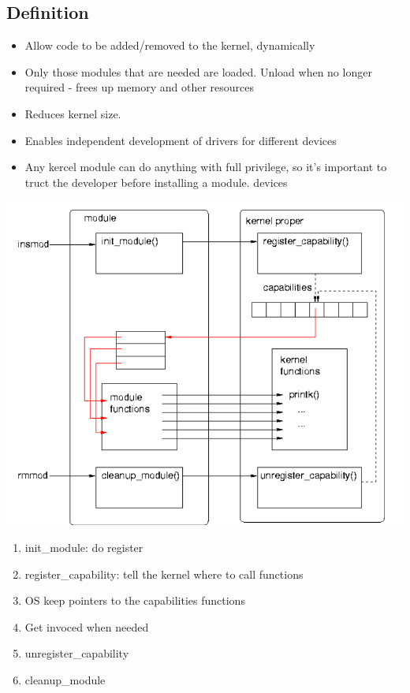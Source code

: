 \documentclass[12pt]{article}
\begin{document}
\subsection{Definition}
\begin{itemize}
    \item Allow code to be added/removed to the kernel, dynamically 
    \item Only those modules that are needed are loaded. Unload when no longer required - frees up memory and other resources 
    \item Reduces kernel size. 
    \item Enables independent development of drivers for different devices
    \item Any kercel module can do anything with full privilege, so it's important to truct the developer before installing a module.
    devices
\end{itemize}
\includegraphics[width=\textwidth]{KernelWorking.png}
\begin{enumerate}
    \item init\_module: do register
    \item register\_capability: tell the kernel where to call functions
    \item OS keep pointers to the capabilities functions
    \item Get invoced when needed
    \item unregister\_capability
    \item cleanup\_module
\end{enumerate}
\end{document}
